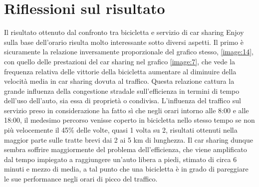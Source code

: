 \section{Riflessioni sul risultato}

Il risultato ottenuto dal confronto tra bicicletta e servizio di car sharing Enjoy sulla base dell'orario risulta molto interessante sotto diversi aspetti. Il primo è sicuramente la relazione inversamente proporzionale del grafico stesso, \ref{image:14}, con quello delle prestazioni del car sharing nel grafico \ref{image:7}, che vede la frequenza relativa delle vittorie della bicicletta aumentare al diminuire della velocità media in car sharing dovuta al traffico. Questa relazione cattura la grande influenza della congestione stradale sull'efficienza in termini di tempo dell'uso dell'auto, sia essa di proprietà o condivisa. L'influenza del traffico sul servizio preso in considerazione ha fatto sì che negli orari intorno alle 8:00 e alle 18:00, il medesimo percorso venisse coperto in bicicletta nello stesso tempo se non più velocemente il 45\% delle volte, quasi 1 volta su 2, risultati ottenuti nella maggior parte sulle tratte brevi dai 2 ai 5 km di lunghezza. Il car sharing dunque sembra soffrire maggiormente del problema dell'efficienza, che viene amplificato dal tempo impiegato a raggiungere un'auto libera a piedi, stimato di circa 6 minuti e mezzo di media, a tal punto che una bicicletta è in grado di pareggiare le sue performance negli orari di picco del traffico.

